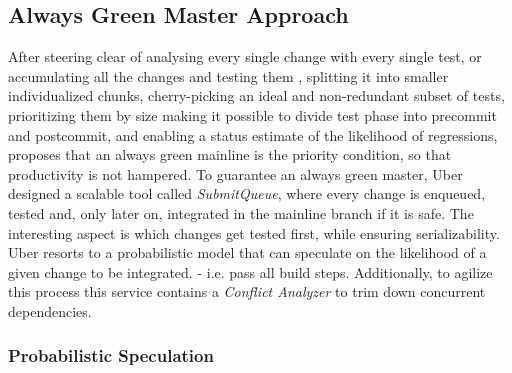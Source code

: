 
\subsection{Always Green Master Approach}

After steering clear of analysing every single change with every single test, or accumulating all the changes and testing them , splitting it into smaller individualized chunks, cherry-picking an ideal and non-redundant subset of tests, prioritizing them by size making it possible to divide test phase into precommit and postcommit, and enabling a status estimate of the likelihood of regressions,   \cite{Uber} proposes that an always green mainline is the priority condition, so that productivity is not hampered. To guarantee an always green master, Uber designed a scalable tool called \textit{SubmitQueue}, where every change is enqueued, tested and, only later on, integrated in the mainline branch if it is safe. The interesting aspect is which changes get tested first, while ensuring serializability. Uber resorts to a probabilistic model that can speculate on the likelihood of a given change to be integrated. - i.e. pass all build steps. Additionally, to agilize this process this service contains a \textit{Conflict Analyzer} to trim down concurrent dependencies. 

\subsubsection{Probabilistic Speculation} 

